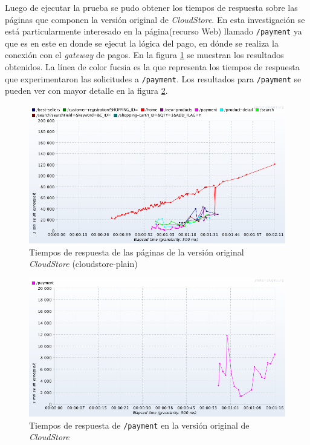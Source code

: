 \documentclass[11pt, twoside]{report}
\begin{document}
Luego de ejecutar la prueba se pudo obtener los tiempos de respuesta sobre las páginas que componen la versión original de \emph{CloudStore}. En esta investigación se está particularmente interesado en la página(recurso Web) llamado \texttt{/payment} ya que es en este en donde se ejecut la lógica del pago, en dónde se realiza la conexión con el \emph{gateway} de pagos. En la figura \ref{fig:cs-plain-1} se muestran los resultados obtenidos. La línea de color fucsia es la que representa los tiempos de respuesta que experimentaron las solicitudes a \texttt{/payment}. Los resultados para \texttt{/payment} se pueden ver con mayor detalle en la figura \ref{fig:cs-plain-2}. 

\begin{figure}[h]
  \centering
  \includegraphics[width=15cm]{response-over-time-local-to-prod-1-plain}
  \caption{\small{Tiempos de respuesta de las páginas de la versión original \emph{CloudStore} (cloudstore-plain)}}
  \label{fig:cs-plain-1}
\end{figure}

\begin{figure}[h]
  \centering
  \includegraphics[width=15cm]{response-over-time-local-to-prod-1-plain-payment}
  \caption{\small{Tiempos de respuesta de \texttt{/payment} en la versión original de \emph{CloudStore}}}
  \label{fig:cs-plain-2}
\end{figure}
\end{document}
